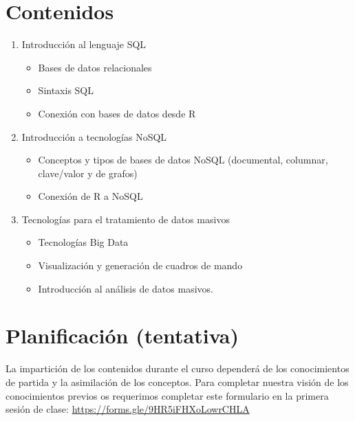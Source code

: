 \documentclass[]{book}
\providecommand{\tightlist}{%
  \setlength{\itemsep}{0pt}\setlength{\parskip}{0pt}}
\begin{document}
\hypertarget{contenidos}{%
\section{Contenidos}\label{contenidos}}

\begin{enumerate}
\def\labelenumi{\arabic{enumi}.}
\tightlist
\item
  Introducción al lenguaje SQL

  \begin{itemize}
  \tightlist
  \item
    Bases de datos relacionales
  \item
    Sintaxis SQL
  \item
    Conexión con bases de datos desde R
  \end{itemize}
\item
  Introducción a tecnologías NoSQL

  \begin{itemize}
  \tightlist
  \item
    Conceptos y tipos de bases de datos NoSQL (documental, columnar, clave/valor y de grafos)
  \item
    Conexión de R a NoSQL
  \end{itemize}
\item
  Tecnologías para el tratamiento de datos masivos

  \begin{itemize}
  \tightlist
  \item
    Tecnologías Big Data
  \item
    Visualización y generación de cuadros de mando
  \item
    Introducción al análisis de datos masivos.
  \end{itemize}
\end{enumerate}

\hypertarget{planificacion-tentativa}{%
\section{Planificación (tentativa)}\label{planificacion-tentativa}}

La impartición de los contenidos durante el curso dependerá de los conocimientos de partida y la asimilación de los
conceptos. Para completar nuestra visión de los conocimientos previos os requerimos completar este formulario en la primera sesión de clase: \url{https://forms.gle/9HR5iFHXoLowrCHLA}
\end{document}

